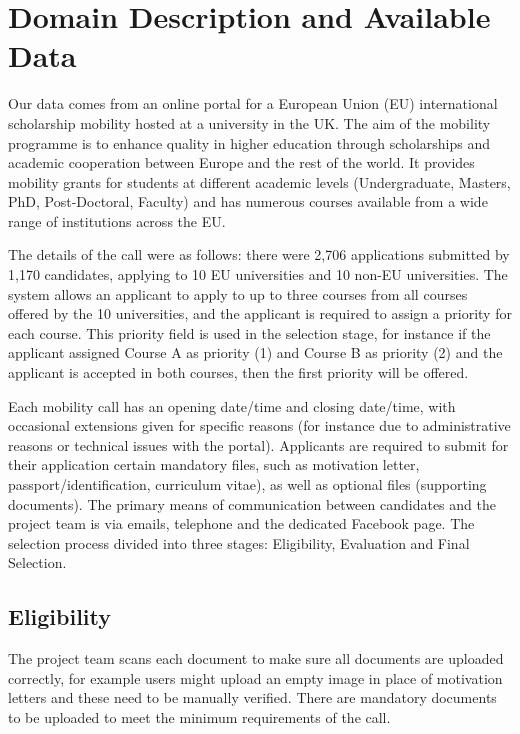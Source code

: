 \documentclass[letterpaper]{article}
\begin{document}
\section{Domain Description and Available Data}

Our data comes from an online portal for a European Union (EU)
international scholarship mobility hosted at a university in the
UK. The aim of the mobility programme is to enhance quality in higher
education through scholarships and academic cooperation between Europe
and the rest of the world. It provides mobility grants for students at
different academic levels (Undergraduate, Masters, PhD, Post-Doctoral,
Faculty) and has numerous courses available from a wide range of
institutions across the EU.

The details of the call were as follows: there were 2,706 applications
submitted by 1,170 candidates, applying to 10 EU universities and 10
non-EU universities. The system allows an applicant to apply to up to
three courses from all courses offered by the 10 universities, and the
applicant is required to assign a priority for each course. This
priority field is used in the selection stage, for instance if the
applicant assigned Course A as priority (1) and Course B as priority
(2) and the applicant is accepted in both courses, then the first
priority will be offered.

Each mobility call has an opening date/time and closing date/time,
with occasional extensions given for specific reasons (for instance
due to administrative reasons or technical issues with the
portal). Applicants are required to submit for their application
certain mandatory files, such as motivation letter,
passport/identification, curriculum vitae), as well as optional files
(supporting documents). The primary means of communication between
candidates and the project team is via emails, telephone and the
dedicated Facebook page. The selection process divided into three
stages: Eligibility, Evaluation and Final Selection.

\subsection{Eligibility}

The project team scans each document to make sure all documents are
uploaded correctly, for example users might upload an empty image in
place of motivation letters and these need to be manually
verified. There are mandatory documents to be uploaded to meet the
minimum requirements of the call.
\end{document}
